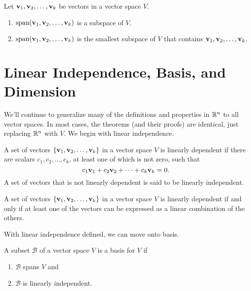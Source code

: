 \documentclass[../m073main.tex]{subfiles}
\begin{document}
\begin{theorem}
	Let $\mathbf{v}_1, \mathbf{v}_2, \ldots, \mathbf{v}_k$ be vectors in a vector space $V$.
	\begin{enumerate}[label=(\alph*)]
		\item $\textrm{span}(\mathbf{v}_1, \mathbf{v}_2, \ldots, \mathbf{v}_k)$ is a subspace of $V$.
		\item $\textrm{span}(\mathbf{v}_1, \mathbf{v}_2, \ldots, \mathbf{v}_k)$ is the smallest subspace of $V$ that contains $\mathbf{v}_1, \mathbf{v}_2, \ldots, \mathbf{v}_k$.
	\end{enumerate}
\end{theorem}

\section{Linear Independence, Basis, and Dimension}
We'll continue to generalize many of the definitions and properties in $\mathbb{R}^n$ to all vector spaces.
In most cases, the theorems (and their proofs) are identical, just replacing $\mathbb{R}^n$ with $V$.
We begin with linear independence.

\begin{definition}
	A set of vectors $\{\mathbf{v}_1, \mathbf{v}_2, \ldots, \mathbf{v}_k\}$ in a vector space $V$ is linearly dependent if there are scalars $c_1, c_2, \ldots, c_k$, at least one of which is not zero, such that
	\[ c_1 \mathbf{v}_1 + c_2 \mathbf{v}_2 + \cdots + c_k \mathbf{v}_k = 0. \]
	A set of vectors that is not linearly dependent is said to be linearly independent.
\end{definition}

\begin{theorem}
	A set of vectors $\{\mathbf{v}_1, \mathbf{v}_2, \ldots, \mathbf{v}_k\}$ in a vector space $V$ is linearly dependent if and only if at least one of the vectors can be expressed as a linear combination of the others.
\end{theorem}

With linear independence defined, we can move onto basis.

\begin{definition}[Basis]
	A subset $\mathcal{B}$ of a vector space $V$ is a basis for $V$ if
	\begin{enumerate}
		\item $\mathcal{B}$ spans $V$ and
		\item $\mathcal{B}$ is linearly independent.
	\end{enumerate}
\end{definition}
\end{document}
